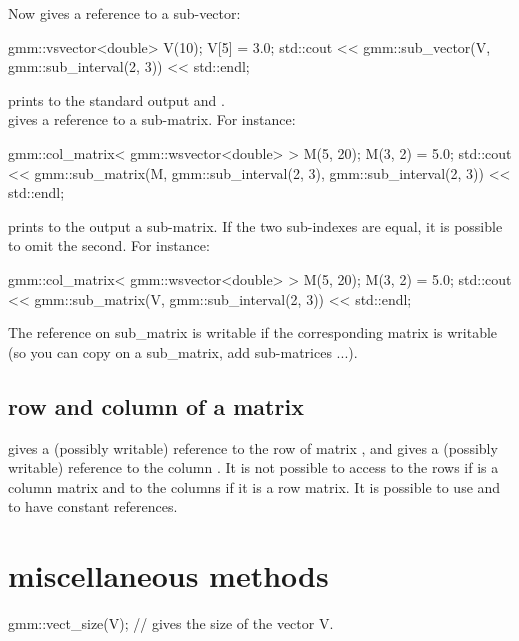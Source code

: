 \documentclass[11pt,a4paper]{article}
\begin{document}
Now  gives a reference to a sub-vector:
\begin{cppcode}
  gmm::vsvector<double> V(10);
  V[5] = 3.0;
  std::cout << gmm::sub_vector(V, gmm::sub_interval(2, 3)) << std::endl;  
\end{cppcode}
prints to the standard output  and .\\

 gives a reference to a sub-matrix. For instance:
\begin{cppcode}
  gmm::col_matrix< gmm::wsvector<double> > M(5, 20);
  M(3, 2) = 5.0;
  std::cout << gmm::sub_matrix(M, gmm::sub_interval(2, 3), gmm::sub_interval(2, 3))
            << std::endl;  
\end{cppcode}
prints to the output a sub-matrix. If the two sub-indexes are equal, it is possible to omit the second. For instance:
\begin{cppcode}
  gmm::col_matrix< gmm::wsvector<double> > M(5, 20);
  M(3, 2) = 5.0;
  std::cout << gmm::sub_matrix(V, gmm::sub_interval(2, 3)) << std::endl;  
\end{cppcode}
The reference on sub_matrix is writable if the corresponding matrix is writable (so you can copy on a sub_matrix, add sub-matrices ...).

\subsection{row and column of a matrix}
 gives a (possibly writable) reference to the row  of matrix , and   gives a (possibly writable) reference to the column . It is not possible to access to the rows if  is a column matrix and to the columns if it is a row matrix. It is possible to use  and  to have constant references.

\section{miscellaneous methods}
\begin{cppcode}
  gmm::vect_size(V); // gives the size of the vector V.
\end{cppcode}
\end{document}
